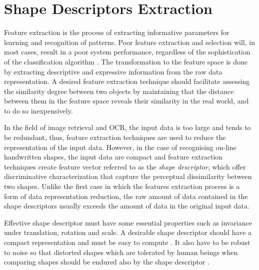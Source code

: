 \newpage{}

\section{Shape Descriptors Extraction}
\label{sec:feature_extraction}
\iftoggle{edit-mode}{\hspace{0pt}\marginpar{Feature extraction}}{}
Feature extraction is the process of extracting informative parameters for learning and recognition of patterns. 
Poor feature extraction and selection will, in most cases, result in a poor system performance, regardless of the sophistication of the classification algorithm \cite{parizeau2001character}.
The transformation to the feature space is done by extracting descriptive and expressive information from the raw data representation. 
A desired feature extraction technique should facilitate assessing the similarity degree between two objects by maintaining that the distance between them in the feature space reveals their similarity in the real world, and to do so inexpensively.

\iftoggle{edit-mode}{\hspace{0pt}\marginpar{Introduction - Cont.}}{}
In the field of image retrieval and OCR, the input data is too large and tends to be redundant, thus, feature extraction techniques are used to reduce the representation of the input data. 
However, in the case of recognising on-line handwritten shapes, the input data are compact and feature extraction techniques create feature vector referred to as the \emph{shape descriptor}, which offer discriminative characterization that capture the perceptual dissimilarity between two shapes. 
Unlike the first case in which the features extraction process is a form of data representation reduction, the raw amount of data contained in the shape descriptors usually exceeds the amount of data in the original input data.

\iftoggle{edit-mode}{\hspace{0pt}\marginpar{Shape Descriptors}}{}
Effective shape descriptor must have some essential properties such as invariance under translation, rotation and scale. 
A desirable shape descriptor should have a compact representation and must be easy to compute \cite{zhang2004review}.
It also have to be robust to noise so that distorted shapes which are tolerated by human beings when comparing shapes should be endured also by the shape descriptor \cite{zhang2004review, kim2000region}.

